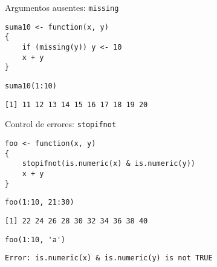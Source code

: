 \documentclass[xcolor={usenames,svgnames,dvipsnames}]{beamer}
\begin{document}
\begin{frame}[fragile,label={sec:orgheadline9}]{Argumentos ausentes: \texttt{missing}}
 \lstset{language=R,label= ,caption= ,captionpos=b,numbers=none}
\begin{lstlisting}
suma10 <- function(x, y)
{
    if (missing(y)) y <- 10
    x + y
}
\end{lstlisting}

\lstset{language=R,label= ,caption= ,captionpos=b,numbers=none}
\begin{lstlisting}
suma10(1:10)
\end{lstlisting}

\begin{verbatim}
[1] 11 12 13 14 15 16 17 18 19 20
\end{verbatim}
\end{frame}

\begin{frame}[fragile,label={sec:orgheadline10}]{Control de errores: \texttt{stopifnot}}
 \lstset{language=R,label= ,caption= ,captionpos=b,numbers=none}
\begin{lstlisting}
foo <- function(x, y)
{
    stopifnot(is.numeric(x) & is.numeric(y))
    x + y
}
\end{lstlisting}

\lstset{language=R,label= ,caption= ,captionpos=b,numbers=none}
\begin{lstlisting}
foo(1:10, 21:30)
\end{lstlisting}

\begin{verbatim}
[1] 22 24 26 28 30 32 34 36 38 40
\end{verbatim}

\lstset{language=R,label= ,caption= ,captionpos=b,numbers=none}
\begin{lstlisting}
foo(1:10, 'a')
\end{lstlisting}

\begin{verbatim}
Error: is.numeric(x) & is.numeric(y) is not TRUE
\end{verbatim}
\end{frame}
\end{document}
